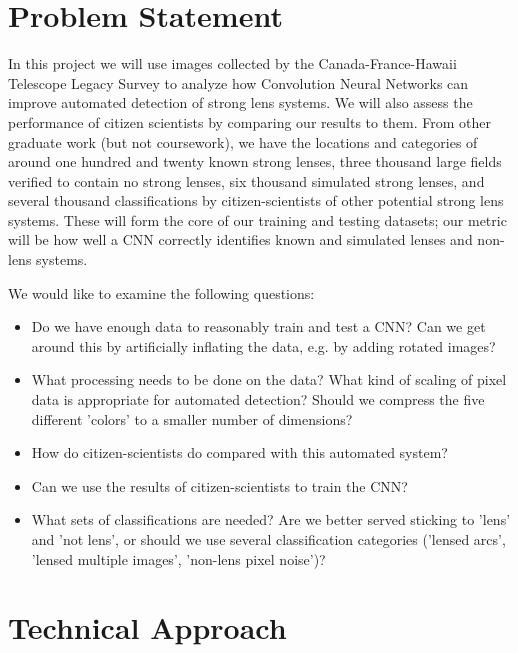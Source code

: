\documentclass[10pt,twocolumn,letterpaper]{article}
\begin{document}
\section{Problem Statement}

In this project we will use images collected by the Canada-France-Hawaii
Telescope Legacy Survey to analyze how Convolution Neural Networks can improve
automated detection of strong lens systems. We will also assess the performance
of citizen scientists by comparing our results to them. From other graduate
work (but not coursework), we have the locations and categories of around one
hundred and twenty known strong lenses, three thousand large fields verified to
contain no strong lenses, six thousand simulated strong lenses, and several
thousand classifications by citizen-scientists of other potential strong lens
systems.  These will form the core of our training and testing datasets; our
metric will be how well a CNN correctly identifies known and simulated lenses
and non-lens systems.

We would like to examine the following questions:
\begin{itemize}
\item{ Do we have enough data to reasonably train and test a CNN? Can we get
       around this by artificially inflating the data, e.g. by adding rotated
     images?}
\item{ What processing needs to be done on the data? What kind of scaling of
       pixel data is appropriate for automated detection? Should we compress
     the five different 'colors' to a smaller number of dimensions?}
   \item{ How do citizen-scientists do compared with this automated system?}
   \item{Can we use the results of citizen-scientists to train the CNN?}
\item{What sets of classifications are needed? Are we better served sticking
       to 'lens' and 'not lens', or should we use several classification
       categories ('lensed arcs', 'lensed multiple images', 'non-lens pixel
     noise')?}
\end{itemize}


\section{Technical Approach}
\end{document}

